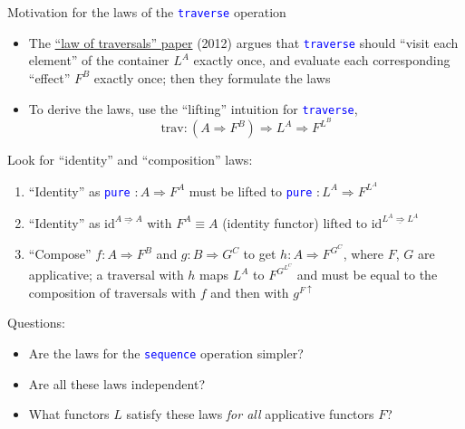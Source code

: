 \documentclass[english]{beamer}
\begin{document}
\begin{frame}{Motivation for the laws of the \texttt{\textcolor{blue}{\footnotesize{}traverse}}
operation }
\begin{itemize}
\item \vspace{-0.2cm}The \href{https://arxiv.org/pdf/1202.2919.pdf}{\textquotedblleft law of traversals\textquotedblright{} paper}
(2012) argues that \texttt{\textcolor{blue}{\footnotesize{}traverse}}
should ``visit each element'' of the container $L^{A}$ exactly
once, and evaluate each corresponding ``effect'' $F^{B}$ exactly
once; then they formulate the laws
\item To derive the laws, use the ``lifting'' intuition for \texttt{\textcolor{blue}{\footnotesize{}traverse}},{\footnotesize{}
\[
\text{trav}:(A\Rightarrow F^{B})\Rightarrow L^{A}\Rightarrow F^{L^{B}}
\]
}{\footnotesize \par}
\end{itemize}
{\footnotesize{}L}ook for ``identity'' and ``composition'' laws:
\begin{enumerate}
\item ``Identity'' as \texttt{\textcolor{blue}{\footnotesize{}pure}} $:A\Rightarrow F^{A}$
must be lifted to \texttt{\textcolor{blue}{\footnotesize{}pure}} $:L^{A}\Rightarrow F^{L^{A}}$
\item ``Identity'' as $\text{id}^{\underline{A\Rightarrow A}}$ with $F^{A}\equiv A$
(identity functor) lifted to $\text{id}^{\underline{L^{A}\Rightarrow L^{A}}}$
\item ``Compose'' $f:A\Rightarrow F^{B}$ and $g:B\Rightarrow G^{C}$
to get $h:A\Rightarrow F^{G^{C}}$, where $F$, $G$ are applicative;
a traversal with $h$ maps $L^{A}$ to $F^{G^{L^{C}}}$ and must be
equal to the composition of traversals with $f$ and then with $g^{F\uparrow}$
\end{enumerate}
Questions:
\begin{itemize}
\item Are the laws for the \texttt{\textcolor{blue}{\footnotesize{}sequence}}
operation simpler?
\item Are all these laws independent?
\item What functors $L$ satisfy these laws \emph{for all} applicative functors
$F$?
\end{itemize}
\end{frame}
\end{document}
